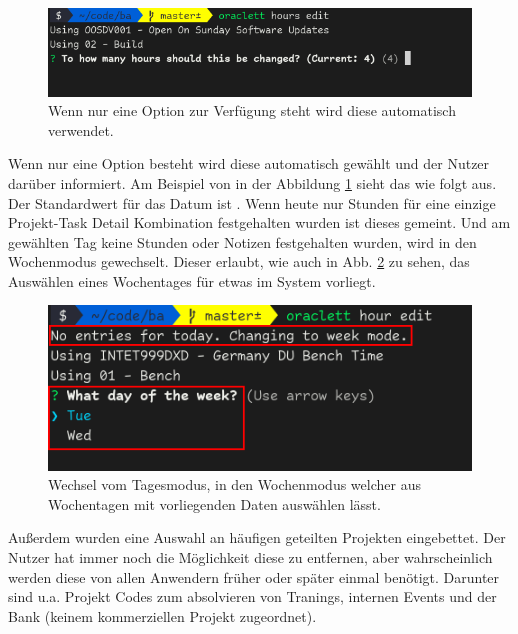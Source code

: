 \documentclass[oneside,bibliography=totocnumbered,BCOR=5mm]{scrbook}
\begin{document}
\medskip

\begin{figure}
  \centering
  \includegraphics[scale=0.5]{hours-edit-defaults.png}
  \caption{Wenn nur eine Option zur Verfügung steht wird diese automatisch verwendet.}
  \label{fig:hours-edit-defaults}
\end{figure}

Wenn nur eine Option besteht wird diese automatisch gewählt und der Nutzer
darüber informiert. Am Beispiel von  in der Abbildung
\ref{fig:hours-edit-defaults} sieht das wie folgt aus. Der Standardwert für
das Datum ist . Wenn heute nur Stunden für eine einzige
Projekt-Task Detail Kombination festgehalten wurden ist dieses gemeint. Und
am gewählten Tag keine Stunden oder Notizen festgehalten wurden, wird in den
Wochenmodus gewechselt. Dieser erlaubt, wie auch in Abb. \ref{fig:day-week-mode}
zu sehen, das Auswählen eines Wochentages für etwas im System vorliegt.

\begin{figure}
  \centering
  \includegraphics[scale=0.5]{day-week-mode.png}
  \caption{Wechsel vom Tagesmodus, in den Wochenmodus welcher aus Wochentagen mit vorliegenden Daten auswählen lässt.}
  \label{fig:day-week-mode}
\end{figure}

Außerdem wurden eine Auswahl an häufigen geteilten Projekten eingebettet. Der
Nutzer hat immer noch die Möglichkeit diese zu entfernen, aber wahrscheinlich
werden diese von allen Anwendern früher oder später einmal benötigt. Darunter
sind u.a. Projekt Codes zum absolvieren von Tranings, internen Events und der
Bank (keinem kommerziellen Projekt zugeordnet).
\end{document}
